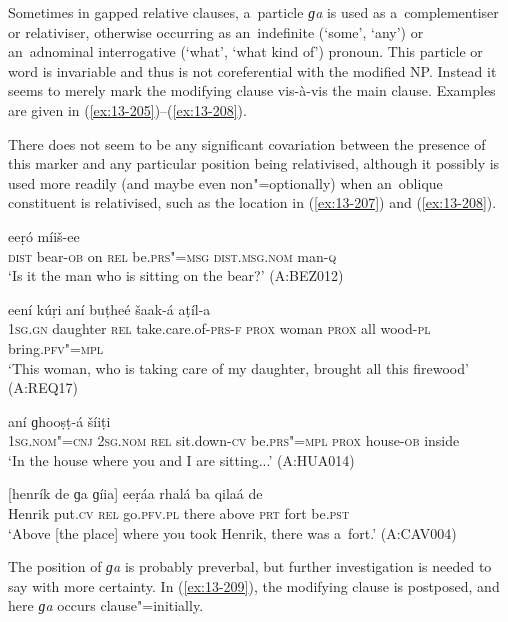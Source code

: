 Sometimes in gapped relative clauses, a~particle \textit{ɡa} is used as a~complementiser or relativiser, otherwise occurring as an~indefinite (`some', `any') or an~adnominal interrogative (`what', `what kind of') pronoun. This particle or word is invariable and thus is not coreferential with the modified NP. Instead it seems to merely mark the modifying clause vis-à-vis the main clause. Examples are given in (\ref{ex:13-205})--(\ref{ex:13-208}).


There does not seem to be any significant covariation between the presence of this marker and any particular position being relativised, although it possibly is used more readily (and maybe even non"=optionally) when an~oblique constituent is relativised, such as the location in (\ref{ex:13-207}) and (\ref{ex:13-208}). 

\begin{exe}
\ex
\label{ex:13-205}
 eeṛó  míiš-ee \\
\textsc{dist} bear-\textsc{ob} on \textsc{rel} be.\textsc{prs"=msg} \textsc{dist.msg.nom}   man-\textsc{q} \\
\glt `Is it the man who is sitting on the bear?' (A:BEZ012)

\ex
\label{ex:13-206}
 eení kúṛi  aní buṭheé šaak-á aṭíl-a \\
\textsc{1sg.gn} daughter \textsc{rel} take.care.of-\textsc{prs-f} \textsc{prox} woman \textsc{prox} all wood-\textsc{pl} bring.\textsc{pfv"=mpl} \\
\glt `This woman, who is taking care of my daughter, brought all this firewood' (A:REQ17)

\ex
\label{ex:13-207}
  aní ɡhooṣṭ-á šíiṭi \\
\textsc{1sg.nom"=cnj} \textsc{2sg.nom} \textsc{rel} sit.down-\textsc{cv} be.\textsc{prs"=mpl} \textsc{prox} house-\textsc{ob} inside  \\
\glt `In the house where you and I are sitting...' (A:HUA014)

\ex
\label{ex:13-208}
\gll \label{bkm:Ref190845659}[henrík de ɡa ɡíia] eeṛáa rhalá ba  qilaá de \\
Henrik put.\textsc{cv} \textsc{rel} go.\textsc{pfv.pl}  there above \textsc{prt} fort be.\textsc{pst } \\
\glt `Above [the place] where you took Henrik, there was a~fort.' (A:CAV004) 
\end{exe}

The position of \textit{ɡa} is probably preverbal, but further investigation is needed to say with more certainty. In (\ref{ex:13-209}), the modifying clause is postposed, and here \textit{ɡa} occurs clause"=initially.

